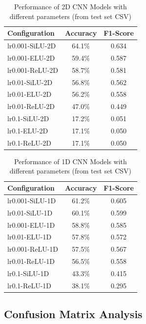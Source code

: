 \begin{table}[h]
\centering
\caption{Performance of 2D CNN Models with different parameters (from test set CSV)}
\label{tab:2d_results}
\begin{tabular}{@{}lcc@{}}
\toprule
\textbf{Configuration} & \textbf{Accuracy} & \textbf{F1-Score} \\
\midrule
lr0.001-SiLU-2D & 64.1\% & 0.634 \\
lr0.001-ELU-2D & 59.4\% & 0.587 \\
lr0.001-ReLU-2D & 58.7\% & 0.581 \\
lr0.01-SiLU-2D & 56.8\% & 0.562 \\
lr0.01-ELU-2D & 56.2\% & 0.558 \\
lr0.01-ReLU-2D & 47.0\% & 0.449 \\
lr0.1-SiLU-2D & 17.2\% & 0.051 \\
lr0.1-ELU-2D & 17.1\% & 0.050 \\
lr0.1-ReLU-2D & 17.1\% & 0.050 \\
\bottomrule
\end{tabular}
\end{table}

\begin{table}[h]
\centering
\caption{Performance of 1D CNN Models with different parameters (from test set CSV)}
\label{tab:1d_results}
\begin{tabular}{@{}lcc@{}}
\toprule
\textbf{Configuration} & \textbf{Accuracy} & \textbf{F1-Score} \\
\midrule
lr0.001-SiLU-1D & 61.2\% & 0.605 \\
lr0.01-SiLU-1D & 60.1\% & 0.599 \\
lr0.001-ELU-1D & 58.8\% & 0.585 \\
lr0.01-ELU-1D & 57.8\% & 0.572 \\
lr0.001-ReLU-1D & 57.5\% & 0.567 \\
lr0.01-ReLU-1D & 56.5\% & 0.558 \\
lr0.1-SiLU-1D & 43.3\% & 0.415 \\
lr0.1-ReLU-1D & 38.1\% & 0.295 \\
\bottomrule
\end{tabular}
\end{table}

\subsection{Confusion Matrix Analysis}

